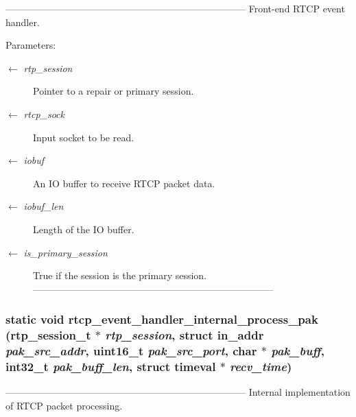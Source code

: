 --------------------------------------------------------------------------- Front-end RTCP event handler.

\begin{Desc}
\item[Parameters:]
\begin{description}
\item[\mbox{$\leftarrow$} {\em rtp\_\-session}]Pointer to a repair or primary session. \item[\mbox{$\leftarrow$} {\em rtcp\_\-sock}]Input socket to be read. \item[\mbox{$\leftarrow$} {\em iobuf}]An IO buffer to receive RTCP packet data. \item[\mbox{$\leftarrow$} {\em iobuf\_\-len}]Length of the IO buffer. \item[\mbox{$\leftarrow$} {\em is\_\-primary\_\-session}]True if the session is the primary session. --------------------------------------------------------------------------- \end{description}
\end{Desc}
\subsubsection{\setlength{\rightskip}{0pt plus 5cm}static void rtcp\_\-event\_\-handler\_\-internal\_\-process\_\-pak (rtp\_\-session\_\-t $\ast$ {\em rtp\_\-session}, struct in\_\-addr {\em pak\_\-src\_\-addr}, uint16\_\-t {\em pak\_\-src\_\-port}, char $\ast$ {\em pak\_\-buff}, int32\_\-t {\em pak\_\-buff\_\-len}, struct timeval $\ast$ {\em recv\_\-time})\hspace{0.3cm}{\tt  [static]}}\label{vqec__rtp_8c_ced4404f0493fbbe00f52cb61ad44e86}


--------------------------------------------------------------------------- Internal implementation of RTCP packet processing.

